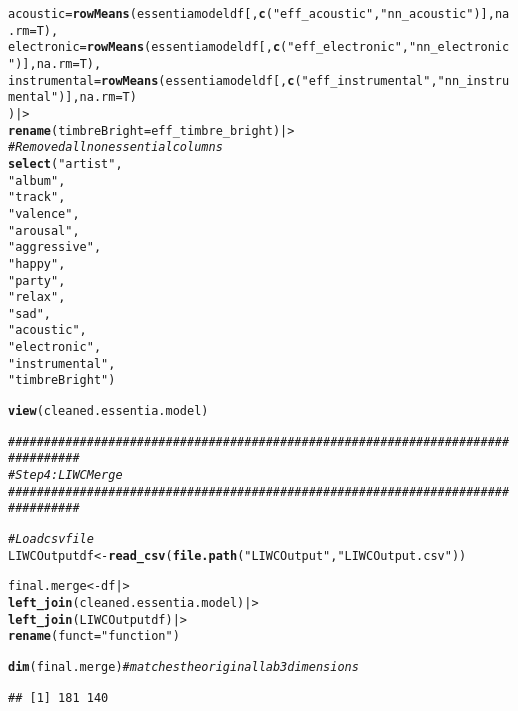 \documentclass{article}\usepackage[]{graphicx}\usepackage[]{xcolor}
\makeatletter
\newcommand{\hlsng}[1]{\textcolor[rgb]{0.192,0.494,0.8}{#1}}%
\newcommand{\hlcom}[1]{\textcolor[rgb]{0.678,0.584,0.686}{\textit{#1}}}%
\newcommand{\hldef}[1]{\textcolor[rgb]{0.345,0.345,0.345}{#1}}%
\newcommand{\hlkwb}[1]{\textcolor[rgb]{0.69,0.353,0.396}{#1}}%
\newcommand{\hlkwc}[1]{\textcolor[rgb]{0.333,0.667,0.333}{#1}}%
\newcommand{\hlkwd}[1]{\textcolor[rgb]{0.737,0.353,0.396}{\textbf{#1}}}%
\newenvironment{kframe}{%
 \def\at@end@of@kframe{}%
 \ifinner\ifhmode%
  \def\at@end@of@kframe{\end{minipage}}%
  \begin{minipage}{\columnwidth}%
 \fi\fi%
 \def\FrameCommand##1{\hskip\@totalleftmargin \hskip-\fboxsep
 \colorbox{shadecolor}{##1}\hskip-\fboxsep
     \hskip-\linewidth \hskip-\@totalleftmargin \hskip\columnwidth}%
 \MakeFramed {\advance\hsize-\width
   \@totalleftmargin\z@ \linewidth\hsize
   \@setminipage}}%
 {\par\unskip\endMakeFramed%
 \at@end@of@kframe}
\newenvironment{knitrout}{}{} %
\makeatother
\begin{document}
\begin{enumerate}
\begin{knitrout}
\begin{kframe}
\begin{alltt}
    \hlkwc{acoustic} \hldef{=} \hlkwd{rowMeans}\hldef{(essentiamodeldf[,}\hlkwd{c}\hldef{(}\hlsng{"eff_acoustic"}\hldef{,} \hlsng{"nn_acoustic"}\hldef{)],} \hlkwc{na.rm} \hldef{= T),}
    \hlkwc{electronic} \hldef{=} \hlkwd{rowMeans}\hldef{(essentiamodeldf[,}\hlkwd{c}\hldef{(}\hlsng{"eff_electronic"}\hldef{,} \hlsng{"nn_electronic"}\hldef{)],} \hlkwc{na.rm} \hldef{= T),}
    \hlkwc{instrumental} \hldef{=} \hlkwd{rowMeans}\hldef{(essentiamodeldf[,}\hlkwd{c}\hldef{(}\hlsng{"eff_instrumental"}\hldef{,} \hlsng{"nn_instrumental"}\hldef{)],} \hlkwc{na.rm} \hldef{= T)}
  \hldef{) |>}
  \hlkwd{rename}\hldef{(}\hlkwc{timbreBright} \hldef{= eff_timbre_bright) |>}
  \hlcom{# Removed all nonessential columns}
  \hlkwd{select}\hldef{(}\hlsng{"artist"}\hldef{,}
         \hlsng{"album"}\hldef{,}
         \hlsng{"track"}\hldef{,}
         \hlsng{"valence"}\hldef{,}
         \hlsng{"arousal"}\hldef{,}
         \hlsng{"aggressive"}\hldef{,}
         \hlsng{"happy"}\hldef{,}
         \hlsng{"party"}\hldef{,}
         \hlsng{"relax"}\hldef{,}
         \hlsng{"sad"}\hldef{,}
         \hlsng{"acoustic"}\hldef{,}
         \hlsng{"electronic"}\hldef{,}
         \hlsng{"instrumental"}\hldef{,}
         \hlsng{"timbreBright"}\hldef{)}

\hlkwd{view}\hldef{(cleaned.essentia.model)}

\hlcom{################################################################################}
\hlcom{# Step 4: LIWC Merge}
\hlcom{################################################################################}

\hlcom{# Load csv file}
\hldef{LIWCOutputdf} \hlkwb{<-} \hlkwd{read_csv}\hldef{(}\hlkwd{file.path}\hldef{(}\hlsng{"LIWCOutput"}\hldef{,} \hlsng{"LIWCOutput.csv"}\hldef{))}

\hldef{final.merge} \hlkwb{<-} \hldef{df |>}
  \hlkwd{left_join}\hldef{(cleaned.essentia.model)|>}
  \hlkwd{left_join}\hldef{(LIWCOutputdf)|>}
  \hlkwd{rename}\hldef{(}\hlkwc{funct} \hldef{=} \hlsng{"function"}\hldef{)}

\hlkwd{dim}\hldef{(final.merge)} \hlcom{# matches the original lab 3 dimensions}
\end{alltt}
\begin{verbatim}
## [1] 181 140
\end{verbatim}
\end{kframe}
\end{knitrout}


\end{enumerate}
\end{document}
